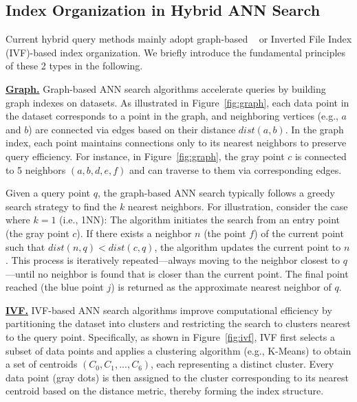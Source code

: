 \documentclass[sigconf, nonacm]{acmart}
\begin{document}
	
	
	\subsection{Index Organization in Hybrid ANN Search}
	
	Current hybrid query methods mainly adopt graph-based ~\cite{nsw,kgraph,nsg,fanng,ngt} or Inverted File Index (IVF)-based \cite{PQ} index organization. We briefly introduce the fundamental principles of these 2 types in the following.
	
	\noindent\textbf{\underline{Graph.}}
	Graph-based ANN search algorithms accelerate queries by building graph indexes on datasets. As illustrated in Figure~\ref{fig:graph}, each data point in the dataset corresponds to a point in the graph, and neighboring vertices (e.g., $a$ and $b$) are connected via edges based on their distance $\textit{dist}(a, b)$. In the graph index, each point maintains connections only to its nearest neighbors to preserve query efficiency. For instance, in Figure~\ref{fig:graph}, the gray point $c$ is connected to 5 neighbors $(a, b, d, e, f)$ and can traverse to them via corresponding edges.
	
	Given a query point $q$, the graph-based ANN search typically follows a greedy search strategy to find the $k$ nearest neighbors. For illustration, consider the case where $k = 1$ (i.e., 1NN): The algorithm initiates the search from an entry point (the gray point $c$). If there exists a neighbor $n$ (the point $f$) of the current point such that $\textit{dist}(n, q) < \textit{dist}(c, q)$, the algorithm updates the current point to $n$. This process is iteratively repeated—always moving to the neighbor closest to $q$—until no neighbor is found that is closer than the current point. The final point reached (the blue point $j$) is returned as the approximate nearest neighbor of $q$.
	
	
	\noindent\textbf{\underline{IVF.}} IVF-based ANN search algorithms improve computational efficiency by partitioning the dataset into clusters and restricting the search to clusters nearest to the query point. Specifically, as shown in Figure~\ref{fig:ivf}, IVF first selects a subset of data points and applies a clustering algorithm (e.g., K-Means) to obtain a set of centroids $(C_0, C_1, ..., C_6)$, each representing a distinct cluster. Every data point (gray dots) is then assigned to the cluster corresponding to its nearest centroid based on the distance metric, thereby forming the index structure.
	
\end{document}

